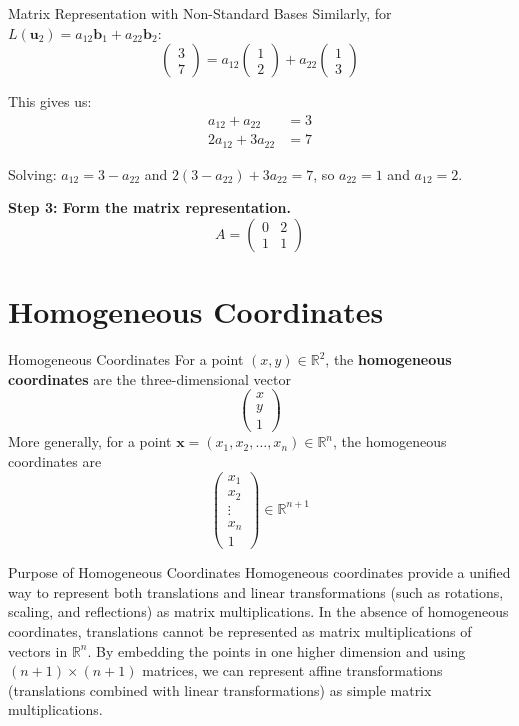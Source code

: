 \documentclass[12pt,a4paper]{article}
\newcommand{\R}{\mathbb{R}}
\newcommand{\vv}[1]{\mathbf{#1}}
\begin{document}
\begin{example}{Matrix Representation with Non-Standard Bases}
		Similarly, for $L(\vv{u}_2) = a_{12}\vv{b}_1 + a_{22}\vv{b}_2$:
		\[
		\begin{pmatrix} 3 \\ 7 \end{pmatrix} = a_{12}\begin{pmatrix} 1 \\ 2 \end{pmatrix} + a_{22}\begin{pmatrix} 1 \\ 3 \end{pmatrix}
		\]
		
		This gives us:
		\begin{align*}
			a_{12} + a_{22} &= 3 \\
			2a_{12} + 3a_{22} &= 7
		\end{align*}
		
		Solving: $a_{12} = 3 - a_{22}$ and $2(3 - a_{22}) + 3a_{22} = 7$, so $a_{22} = 1$ and $a_{12} = 2$.
		
		\textbf{Step 3: Form the matrix representation.}
		\[
		A = \begin{pmatrix} 0 & 2 \\ 1 & 1 \end{pmatrix}
		\]
	\end{example}
	
	\section{Homogeneous Coordinates}
	
	\begin{definition}{Homogeneous Coordinates}
		For a point $(x, y) \in \R^2$, the \textbf{homogeneous coordinates} are the three-dimensional vector
		\[
		\begin{pmatrix} x \\ y \\ 1 \end{pmatrix}
		\]
		More generally, for a point $\vv{x} = (x_1, x_2, \ldots, x_n) \in \R^n$, the homogeneous coordinates are
		\[
		\begin{pmatrix} x_1 \\ x_2 \\ \vdots \\ x_n \\ 1 \end{pmatrix} \in \R^{n+1}
		\]
	\end{definition}
	
	\begin{remark}{Purpose of Homogeneous Coordinates}
		Homogeneous coordinates provide a unified way to represent both translations and linear transformations (such as rotations, scaling, and reflections) as matrix multiplications. In the absence of homogeneous coordinates, translations cannot be represented as matrix multiplications of vectors in $\R^n$. By embedding the points in one higher dimension and using $(n+1) \times (n+1)$ matrices, we can represent affine transformations (translations combined with linear transformations) as simple matrix multiplications.
	\end{remark}
	
\end{document}

